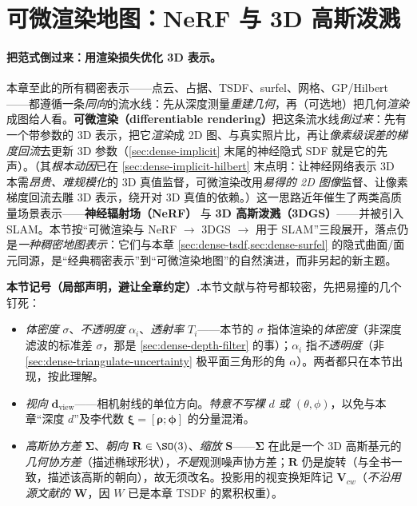\section{可微渲染地图：NeRF 与 3D 高斯泼溅}
\label{sec:dense-radiance}

\paragraph{把范式倒过来：用渲染损失优化 3D 表示。}
本章至此的所有稠密表示——点云、占据、TSDF、surfel、网格、GP/Hilbert——都遵循一条\emph{同向}的流水线：先从深度测量\emph{重建几何}，再（可选地）把几何\emph{渲染}成图给人看。\textbf{可微渲染（differentiable rendering）}把这条流水线\emph{倒过来}：先有一个带参数的 3D 表示，把它\emph{渲染}成 2D 图、与真实照片比，再让\emph{像素级误差的梯度回流}去更新 3D 参数（\cref{sec:dense-implicit} 末尾的神经隐式 SDF 就是它的先声）。（其\emph{根本动因}已在 \cref{sec:dense-implicit-hilbert} 末点明：让神经网络表示 3D 本需\emph{昂贵、难规模化}的 3D 真值监督，可微渲染改用\emph{易得的 2D 图像}监督、让像素梯度回流去雕 3D 表示，绕开对 3D 真值的依赖。）这一思路近年催生了两类高质量场景表示——\textbf{神经辐射场（NeRF）}\cite{mildenhall2020nerf} 与 \textbf{3D 高斯泼溅（3DGS）}\cite{kerbl2023gaussian}——并被引入 SLAM。本节按“可微渲染与 NeRF $\to$ 3DGS $\to$ 用于 SLAM”三段展开，落点仍是\emph{一种稠密地图表示}：它们与本章 \cref{sec:dense-tsdf,sec:dense-surfel} 的隐式曲面/面元同源，是“经典稠密表示”到“可微渲染地图”的自然演进，而非另起的新主题。

\begin{note}
\textbf{本节记号（局部声明，避让全章约定）.}\;本节文献与符号都较密，先把易撞的几个钉死：
\begin{itemize}
  \item \emph{体密度} $\sigma$、\emph{不透明度} $\alpha_i$、\emph{透射率} $T_i$——本节的 $\sigma$ 指体渲染的\emph{体密度}（非深度滤波的标准差 $\sigma$，那是 \cref{sec:dense-depth-filter} 的事）；$\alpha_i$ 指\emph{不透明度}（非 \cref{sec:dense-triangulate-uncertainty} 极平面三角形的角 $\alpha$）。两者都只在本节出现，按此理解。
  \item \emph{视向} $\mathbf{d}_{\mathrm{view}}$——相机射线的单位方向。\emph{特意不写裸 $d$ 或 $(\theta,\phi)$}，以免与本章“深度 $d$”及李代数 $\boldsymbol{\xi}=[\boldsymbol{\rho};\boldsymbol{\phi}]$ 的分量混淆。
  \item \emph{高斯协方差} $\boldsymbol{\Sigma}$、\emph{朝向} $\mathbf{R}\in\SO(3)$、\emph{缩放} $\mathbf{S}$——$\boldsymbol{\Sigma}$ 在此是一个 3D 高斯基元的\emph{几何协方差}（描述椭球形状），\emph{不是}观测噪声协方差；$\mathbf{R}$ 仍是旋转（与全书一致，描述该高斯的朝向），故无须改名。投影用的视变换矩阵记 $\mathbf{V}_{cw}$（\emph{不沿用源文献的 $\mathbf{W}$}，因 $W$ 已是本章 TSDF 的累积权重）。
\end{itemize}
\end{note}


